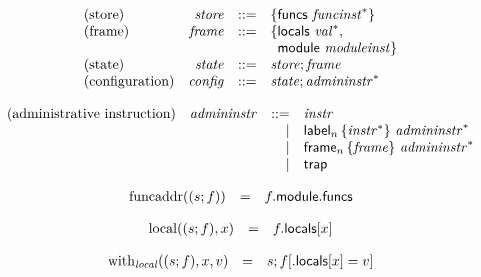 \documentclass{article}
\begin{document}
\vspace{1ex}

$$
\begin{array}{@{}lrrl@{}l@{}}
	\mbox{(store)} & {\mathit{store}} &::=& \{ \begin{array}[t]{@{}l@{}l@{}}
		\mathsf{funcs}~{{\mathit{funcinst}}^\ast} \}\end{array} \\
	\mbox{(frame)} & {\mathit{frame}} &::=& \{ \begin{array}[t]{@{}l@{}l@{}}
		\mathsf{locals}~{{\mathit{val}}^\ast},\; \\
		\mathsf{module}~{\mathit{moduleinst}} \}\end{array} \\
	\mbox{(state)} & {\mathit{state}} &::=& {\mathit{store}} ; {\mathit{frame}} \\
	\mbox{(configuration)} & {\mathit{config}} &::=& {\mathit{state}} ; {{\mathit{admininstr}}^\ast} \\
\end{array}
$$

\vspace{1ex}

$$
\begin{array}{@{}lrrl@{}l@{}}
	\mbox{(administrative instruction)} & {\mathit{admininstr}} &::=& {\mathit{instr}} \\ &&|&
	{\mathsf{label}}_{n}\,\{ {{\mathit{instr}}^\ast} \}~{{\mathit{admininstr}}^\ast} \\ &&|&
	{\mathsf{frame}}_{n}\,\{ {\mathit{frame}} \}~{{\mathit{admininstr}}^\ast} \\ &&|&
	\mathsf{trap} \\
\end{array}
$$

$$
\begin{array}{@{}lcl@{}l@{}}
	{\mathrm{funcaddr}}((s ; f)) &=& f{.}\mathsf{module}{.}\mathsf{funcs} \\
\end{array}
$$

\vspace{1ex}

$$
\begin{array}{@{}lcl@{}l@{}}
	{\mathrm{local}}((s ; f), x) &=& f{.}\mathsf{locals}{}[x] \\
\end{array}
$$

$$
\begin{array}{@{}lcl@{}l@{}}
	{\mathrm{with}}_{\mathit{local}}((s ; f), x, v) &=& s ; f{}[{.}\mathsf{locals}{}[x] = v] \\
\end{array}
$$
\end{document}

